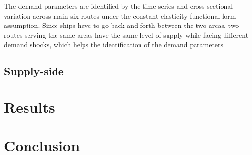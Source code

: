 \documentclass[10pt]{article}
\begin{document}
The demand parameters are identified by the time-series and cross-sectional variation across main six routes under the constant elasticity functional form assumption. Since ships have to go back and forth between the two areas, two routes serving the same areas have the same level of supply while facing different demand shocks, which helps the identification of the demand parameters.


\subsection{Supply-side}



\section{Results}

\section{Conclusion}



\end{document}
